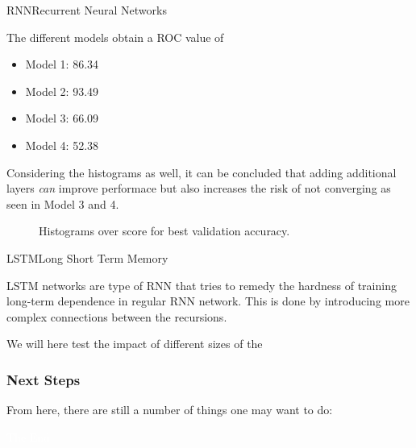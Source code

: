\documentclass{beamer}
\newlength\figureheight
\newlength\figurewidth
\begin{document}
\begin{frame}{RNN}{Recurrent Neural Networks}
	
	\noindent
	\begin{minipage}{0.45\textwidth}%
		 The different models obtain a ROC value of 
		 \begin{itemize}%
		 	\item Model 1: 86.34
		 	\item Model 2: 93.49
		 	\item Model 3: 66.09
		 	\item Model 4: 52.38
		 \end{itemize}
	 	Considering the histograms as well, it can be concluded that adding additional layers \emph{can} improve performace but also increases the risk of not converging as seen in Model 3 and 4.
	\end{minipage} \hfill
	\begin{minipage}{0.45\textwidth}%
		\begin{figure}
			\centering
			
			\setlength\figureheight{3cm}
			\setlength{}
			
			
			\caption{Histograms over score for best validation accuracy.} 
		\end{figure}
	\end{minipage}
\end{frame}


\begin{frame}{LSTM}{Long Short Term Memory}

LSTM networks are type of RNN that tries to remedy the hardness of training long-term dependence in regular RNN network. This is done by introducing more complex connections between the recursions. 

We will here test the impact of different sizes of the
  
\end{frame}


\begin{frame}
  \frametitle{Next Steps}
  From here, there are still a number of things one may want to do:
\end{frame}

\bgroup
{}
\begin{frame}[t,plain]{}{}
  \begin{center}
    {\tiny \textcolor{white}{The End}}
  \end{center}
\end{frame}
\egroup
\end{document}
